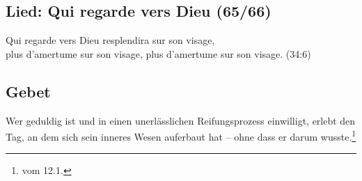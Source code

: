 \subsection{Lied: Qui regarde vers Dieu (65/66)}
\begin{lied}
Qui regarde vers Dieu resplendira sur son visage,\\plus d’amertume sur son visage, plus d'amertume sur son visage.
(34:6)
\end{lied}

\subsection{Gebet}
Wer geduldig ist und in einen unerlässlichen Reifungsprozess einwilligt, erlebt den Tag, an dem sich sein inneres Wesen auferbaut hat – ohne dass er darum wusste.\footnote{\cite{FR-heute} vom 12.1.}
